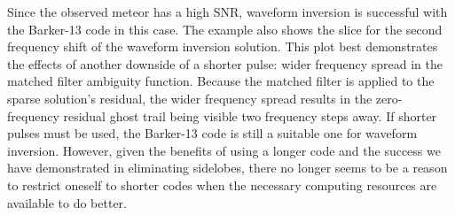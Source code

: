 Since the observed meteor has a high SNR, waveform inversion is successful with the Barker-13 code in this case. The example also shows the slice for the second frequency shift of the waveform inversion solution. This plot best demonstrates the effects of another downside of a shorter pulse: wider frequency spread in the matched filter ambiguity function. Because the matched filter is applied to the sparse solution's residual, the wider frequency spread results in the zero-frequency residual ghost trail being visible two frequency steps away. If shorter pulses must be used, the Barker-13 code is still a suitable one for waveform inversion. However, given the benefits of using a longer code and the success we have demonstrated in eliminating sidelobes, there no longer seems to be a reason to restrict oneself to shorter codes when the necessary computing resources are available to do better.

